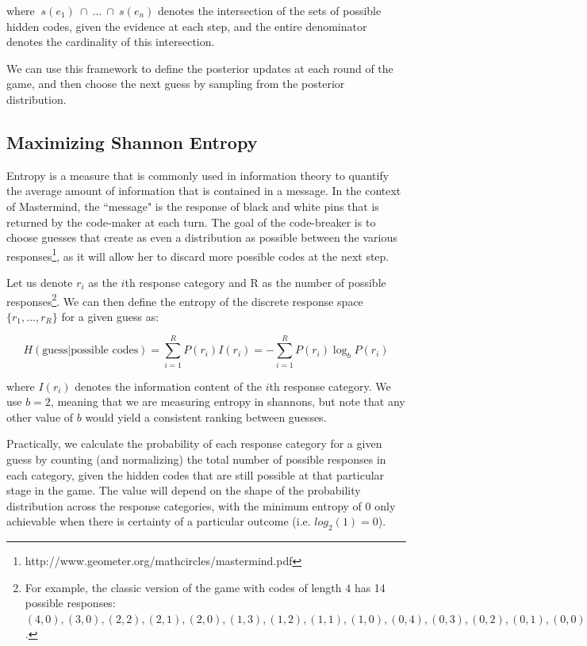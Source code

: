 \documentclass[11pt]{article}
\begin{document}
\noindent where $\ s(e_1) \ \cap \ ... \ \cap \ s(e_n)$ denotes the intersection of the sets of possible hidden codes, given the evidence at each step, and the entire denominator denotes the cardinality of this intersection.

We can use this framework to define the posterior updates at each round of the game, and then choose the next guess by sampling from the posterior distribution.

\subsection{Maximizing Shannon Entropy}

Entropy is a measure that is commonly used in information theory to quantify the average amount of information that is contained in a message. In the context of Mastermind, the ``message" is the response of black and white pins that is returned by the code-maker at each turn. The goal of the code-breaker is to choose guesses that create as even a distribution as possible between the various responses\footnote{http://www.geometer.org/mathcircles/mastermind.pdf}, as it will allow her to discard more possible codes at the next step.

Let us denote $r_i$ as the $i$th response category and R as the number of possible responses\footnote{For example, the classic version of the game with codes of length $4$ has 14 possible responses: $(4, 0), (3, 0), (2, 2), (2, 1), (2, 0), (1, 3), (1, 2), (1, 1), (1, 0), (0, 4), (0, 3), (0, 2), (0, 1), (0, 0)$.}. We can then define the entropy of the discrete response space $\{r_1, ... , r_R\}$ for a given guess as:

\[
H(\text{guess} | \text{possible codes}) = \sum_{i=1}^R P(r_i) I(r_i) = - \sum_{i=1}^R P(r_i) \log_bP(r_i)
\]

\noindent where $I(r_i)$ denotes the information content of the $i$th response category. We use $b=2$, meaning that we are measuring entropy in shannons, but note that any other value of $b$ would yield a consistent ranking between guesses.

Practically, we calculate the probability of each response category for a given guess by counting (and normalizing) the total number of possible responses in each category, given the hidden codes that are still possible at that particular stage in the game. The value will depend on the shape of the probability distribution across the response categories, with the minimum entropy of $0$ only achievable when there is certainty of a particular outcome (i.e. $log_2(1)=0$).
\end{document}
